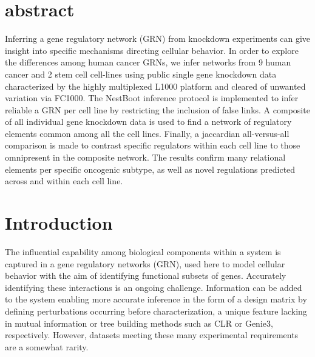 \documentclass[a0,portrait]{a0poster}
\begin{document}
\begin{multicols}{2} %


\color{Navy} %

\section*{abstract}

Inferring a gene regulatory network (GRN) from knockdown experiments can give insight into specific mechanisms directing cellular behavior. In order to explore the differences among human cancer GRNs, we infer networks from 9 human cancer and 2 stem cell cell-lines using public single gene knockdown data characterized by the highly multiplexed L1000 platform and cleared of unwanted variation via FC1000. The NestBoot inference protocol is implemented to infer reliable a GRN per cell line by restricting the inclusion of false links. A composite of all individual gene knockdown data is used to find a network of regulatory elements common among all the cell lines. Finally, a jaccardian all-versus-all comparison is made to contrast specific regulators within each cell line to those omnipresent in the composite network. The results confirm many relational elements per specific oncogenic subtype, as well as novel regulations predicted across and within each cell line.




\color{SaddleBrown} %

\section*{Introduction}

The influential capability among biological components within a system is captured in a gene regulatory networks (GRN), used here to model cellular behavior with the aim of identifying functional subsets of genes. Accurately identifying these interactions is an ongoing challenge. Information can be added to the system enabling more accurate inference in the form of a design matrix by defining perturbations occurring before characterization, a unique feature lacking in mutual information or tree building methods such as CLR\cite{faith2007large} or Genie3\cite{GENIE3}, respectively. However, datasets meeting these many experimental requirements are a somewhat rarity.


\end{multicols}
\end{document}
